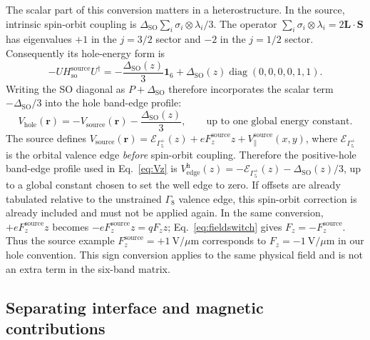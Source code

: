 \documentclass[10pt,letterpaper]{article}
\newcommand{\SO}{\mathrm{SO}}
\newcommand{\one}{\mathbf 1}
\begin{document}
The scalar part of this conversion matters in a heterostructure. In the source, intrinsic spin-orbit coupling is $\Delta_{\SO}\sum_i\sigma_i\otimes\lambda_i/3$. The operator $\sum_i\sigma_i\otimes\lambda_i=2\bm L\cdot\bm S$ has eigenvalues $+1$ in the $j=3/2$ sector and $-2$ in the $j=1/2$ sector. Consequently its hole-energy form is
\begin{equation}
-U H_{\mathrm{so}}^{\mathrm{source}}U^\dagger
=-\frac{\Delta_{\SO}(z)}{3}\one_6
+\Delta_{\SO}(z)\operatorname{diag}(0,0,0,0,1,1).
\label{eq:SOreference}
\end{equation}
Writing the SO diagonal as $P+\Delta_{\SO}$ therefore incorporates the scalar term $-\Delta_{\SO}/3$ into the hole band-edge profile:
\begin{equation}
V_{\mathrm{hole}}(\bm r)
=-V_{\mathrm{source}}(\bm r)-\frac{\Delta_{\SO}(z)}{3},
\qquad\text{up to one global energy constant}.
\label{eq:Vconversion}
\end{equation}
The source defines $V_{\mathrm{source}}(\bm r)=\mathcal E_{\Gamma_5^+}(z)+eF_z^{\mathrm{source}}z+V_{\parallel}^{\mathrm{source}}(x,y)$, where $\mathcal E_{\Gamma_5^+}$ is the orbital valence edge \emph{before} spin-orbit coupling. Therefore the positive-hole band-edge profile used in Eq.~\eqref{eq:Vz} is $V_{\mathrm{edge}}^{\mathrm h}(z)=-\mathcal E_{\Gamma_5^+}(z)-\Delta_{\SO}(z)/3$, up to a global constant chosen to set the well edge to zero. If offsets are already tabulated relative to the unstrained $\Gamma_8$ valence edge, this spin-orbit correction is already included and must not be applied again. In the same conversion, $+eF_z^{\mathrm{source}}z$ becomes $-eF_z^{\mathrm{source}}z=qF_z z$; Eq.~\eqref{eq:fieldswitch} gives $F_z=-F_z^{\mathrm{source}}$. Thus the source example $F_z^{\mathrm{source}}=+1~\mathrm{V}/\mu\mathrm m$ corresponds to $F_z=-1~\mathrm{V}/\mu\mathrm m$ in our hole convention. This sign conversion applies to the same physical field and is not an extra term in the six-band matrix.

\subsection{Separating interface and magnetic contributions}
\end{document}
